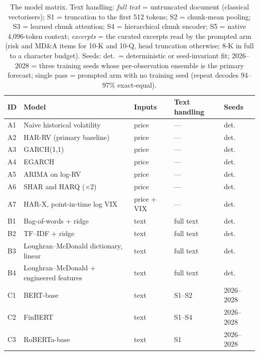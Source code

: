 \begin{table}[htbp]
\centering
\caption[The model matrix]{The model matrix. Text handling: \emph{full text} = untruncated document (classical vectorisers); S1 = truncation to the first 512 tokens; S2 = chunk-mean pooling; S3 = learned chunk attention; S4 = hierarchical chunk encoder; S5 = native 4{,}096-token context; \emph{excerpts} = the curated excerpts read by the prompted arm (risk and MD\&A items for 10-K and 10-Q, head truncation otherwise; 8-K in full to a character budget). Seeds: det.\ = deterministic or seed-invariant fit; 2026--2028 = three training seeds whose per-observation ensemble is the primary forecast; single pass = prompted arm with no training seed (repeat decodes 94--97\% exact-equal).}
\label{tab:model-matrix}
\small
\begin{tabular}{@{}lllll@{}}
\toprule
\textbf{ID} & \textbf{Model} & \textbf{Inputs} & \textbf{Text handling} & \textbf{Seeds} \\
\midrule
A1 & Naive historical volatility & price & --- & det. \\
A2 & HAR-RV (primary baseline) \cite{corsi2009har} & price & --- & det. \\
A3 & GARCH(1,1) \cite{bollerslev1986garch} & price & --- & det. \\
A4 & EGARCH \cite{nelson1991egarch} & price & --- & det. \\
A5 & ARIMA on log-RV \cite{box1970time} & price & --- & det. \\
A6 & SHAR and HARQ ($\times$2) \cite{pattonsheppard2015shar,bollerslev2016harq} & price & --- & det. \\
A7 & HAR-X, point-in-time log VIX \cite{blair2001forecasting} & price + VIX & --- & det. \\
\midrule
B1 & Bag-of-words + ridge & text & full text & det. \\
B2 & TF--IDF + ridge & text & full text & det. \\
B3 & Loughran--McDonald dictionary, linear & text & full text & det. \\
B4 & Loughran--McDonald + engineered features & text & full text & det. \\
\midrule
C1 & BERT-base \cite{devlin2019bert} & text & S1--S2 & 2026--2028 \\
C2 & FinBERT \cite{araci2019finbert} & text & S1--S4 & 2026--2028 \\
C3 & RoBERTa-base \cite{liu2019roberta} & text & S1 & 2026--2028 \\

\end{tabular}
\end{table}

